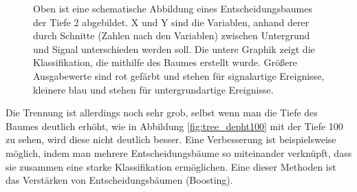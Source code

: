 \begin{figure}[tbp]
\centering     %
{}
\parbox[b]{12cm}{
\caption{Oben ist eine schematische Abbildung eines Entscheidungsbaumes der Tiefe 2 abgebildet. X und Y sind die Variablen, anhand derer durch Schnitte (Zahlen nach den Variablen) zwischen Untergrund und Signal unterschieden werden soll. Die untere Graphik zeigt die Klassifikation, die mithilfe des Baumes erstellt wurde. Gr\"o\ss ere Ausgabewerte sind rot gef\"arbt und stehen f\"ur signalartige Ereignisse, kleinere blau und stehen f\"ur untergrundartige Ereignisse.}
}
\end{figure}

Die Trennung ist allerdings noch sehr grob, selbst wenn man die Tiefe des Baumes deutlich erh\"oht, wie in Abbildung \ref{fig:tree_depht100} mit der Tiefe 100 zu sehen, wird diese nicht deutlich besser. Eine Verbesserung ist beispielsweise m\"oglich, indem man mehrere Entscheidungsb\"aume so miteinander verkn\"upft, dass sie zusammen eine starke Klassifikation erm\"oglichen. Eine dieser Methoden ist das Verst\"arken von Entscheidungsb\"aumen (Boosting).




